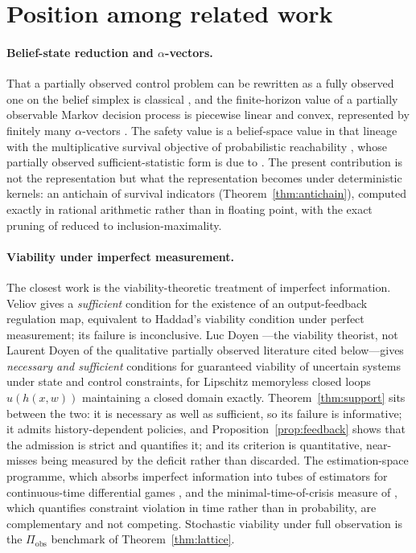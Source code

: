 \documentclass[11pt,a4paper]{article}
\theoremstyle{plain}
\theoremstyle{definition}
\theoremstyle{remark}
\newcommand{\obs}{\mathrm{obs}}
\begin{document}
\section{Position among related work}\label{sec:related}

\paragraph{Belief-state reduction and $\alpha$-vectors.}
That a partially observed control problem can be rewritten as a fully observed one on the belief simplex is classical \cite{Astrom1965,BertsekasShreve1978}, and the finite-horizon value of a partially observable Markov decision process is piecewise linear and convex, represented by finitely many $\alpha$-vectors \cite{SmallwoodSondik1973,Monahan1982,Kaelbling1998}. The safety value is a belief-space value in that lineage with the multiplicative survival objective of probabilistic reachability \cite{Abate2008}, whose partially observed sufficient-statistic form is due to \cite{LesserOishi2014}. The present contribution is not the representation but what the representation becomes under deterministic kernels: an antichain of survival indicators (Theorem~\ref{thm:antichain}), computed exactly in rational arithmetic rather than in floating point, with the exact pruning of \cite{Cassandra1997} reduced to inclusion-maximality.

\paragraph{Viability under imperfect measurement.}
The closest work is the viability-theoretic treatment of imperfect information. Veliov \cite{Veliov1993} gives a \emph{sufficient} condition for the existence of an output-feedback regulation map, equivalent to Haddad's viability condition under perfect measurement; its failure is inconclusive. Luc Doyen \cite{Doyen2000}---the viability theorist, not Laurent Doyen of the qualitative partially observed literature cited below---gives \emph{necessary and sufficient} conditions for guaranteed viability of uncertain systems under state and control constraints, for Lipschitz memoryless closed loops $u(h(x,w))$ maintaining a closed domain exactly. Theorem~\ref{thm:support} sits between the two: it is necessary as well as sufficient, so its failure is informative; it admits history-dependent policies, and Proposition~\ref{prop:feedback} shows that the admission is strict and quantifies it; and its criterion is quantitative, near-misses being measured by the deficit rather than discarded. The estimation-space programme, which absorbs imperfect information into tubes of estimators for continuous-time differential games \cite{Cardaliaguet2007}, and the minimal-time-of-crisis measure of \cite{DoyenSaintPierre1997}, which quantifies constraint violation in time rather than in probability, are complementary and not competing. Stochastic viability under full observation \cite{DeLaraDoyen2008,DoyenDeLara2010} is the $\Pi_{\obs}$ benchmark of Theorem~\ref{thm:lattice}.
\end{document}
